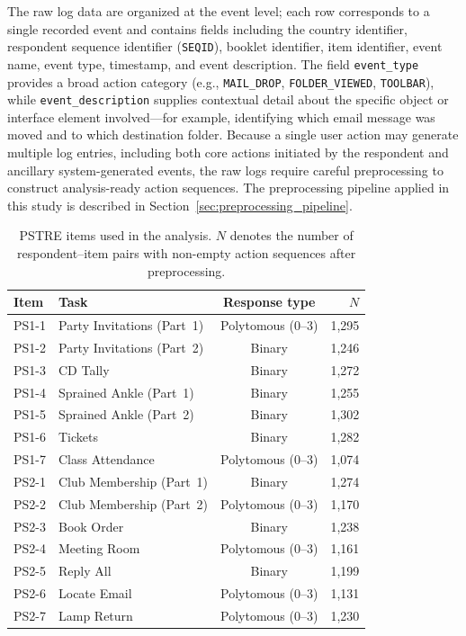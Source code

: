 \documentclass[A4paper,11pt]{article}
\begin{document}
The raw log data are organized at the event level; each row corresponds to a single recorded event and contains fields including the country identifier, respondent sequence identifier (\texttt{SEQID}), booklet identifier, item identifier, event name, event type, timestamp, and event description. The field \texttt{event\_type} provides a broad action category (e.g., \texttt{MAIL\_DROP}, \texttt{FOLDER\_VIEWED}, \texttt{TOOLBAR}), while \texttt{event\_description} supplies contextual detail about the specific object or interface element involved---for example, identifying which email message was moved and to which destination folder. Because a single user action may generate multiple log entries, including both core actions initiated by the respondent and ancillary system-generated events, the raw logs require careful preprocessing to construct analysis-ready action sequences. The preprocessing pipeline applied in this study is described in Section~\ref{sec:preprocessing_pipeline}.

\begin{table}[htbp]
\centering
\caption{PSTRE items used in the analysis. $N$ denotes the number of respondent--item pairs with non-empty action sequences after preprocessing.}
\label{tab:items}
\begin{tabular}{llcr}
\toprule
Item & Task & Response type & $N$ \\
\midrule
PS1-1 & Party Invitations (Part~1) & Polytomous (0--3) & 1,295 \\
PS1-2 & Party Invitations (Part~2) & Binary            & 1,246 \\
PS1-3 & CD Tally                   & Binary            & 1,272 \\
PS1-4 & Sprained Ankle (Part~1)    & Binary            & 1,255 \\
PS1-5 & Sprained Ankle (Part~2)    & Binary            & 1,302 \\
PS1-6 & Tickets                    & Binary            & 1,282 \\
PS1-7 & Class Attendance           & Polytomous (0--3) & 1,074 \\
\midrule
PS2-1 & Club Membership (Part~1)   & Binary            & 1,274 \\
PS2-2 & Club Membership (Part~2)   & Polytomous (0--3) & 1,170 \\
PS2-3 & Book Order                 & Binary            & 1,238 \\
PS2-4 & Meeting Room               & Polytomous (0--3) & 1,161 \\
PS2-5 & Reply All                  & Binary            & 1,199 \\
PS2-6 & Locate Email               & Polytomous (0--3) & 1,131 \\
PS2-7 & Lamp Return                & Polytomous (0--3) & 1,230 \\
\bottomrule
\end{tabular}
\end{table}
\end{document}
